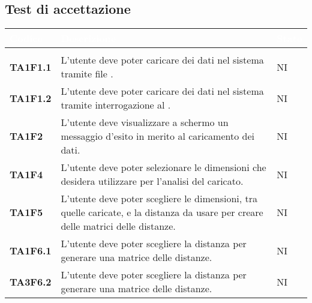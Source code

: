 \subsection{Test di accettazione}


{
\renewcommand{\arraystretch}{1.5}
\renewcommand\extrarowheight{1.5pt}
\setlength\arrayrulewidth{1pt}
\begin{longtable}{ C{2cm} | C{12cm}| C{1.5cm} } 
		\textcolor{white}{\textbf{Codice}} & 
		\textcolor{white}{\textbf{Descrizione}} & 
		\textcolor{white}{\textbf{Stato}} \\
		\endfirsthead
		\\
	    \endfoot
	    \endlastfoot

\textbf{TA1F1.1} & 
L'utente deve poter caricare dei dati nel sistema tramite file . & 
NI\\

\textbf{TA1F1.2} & 
L'utente deve poter caricare dei dati nel sistema tramite interrogazione al . & 
NI\\

\textbf{TA1F2} & 
L'utente deve visualizzare a schermo un messaggio d'esito in merito al caricamento dei dati. & 
NI\\
		
\textbf{TA1F4} & 
L'utente deve poter selezionare le dimensioni che desidera utilizzare per l'analisi del  caricato. & 
NI\\	

\textbf{TA1F5} & 
L'utente deve poter scegliere le dimensioni, tra quelle caricate, e la distanza da usare per creare delle matrici delle distanze. & 
NI\\	

\textbf{TA1F6.1} & 
L'utente deve poter scegliere la distanza \textit{} per generare una matrice delle distanze. & 
NI\\

\textbf{TA3F6.2} & 
L'utente deve poter scegliere la distanza \textit{} per generare una matrice delle distanze. & 
NI\\


\end{longtable}}
